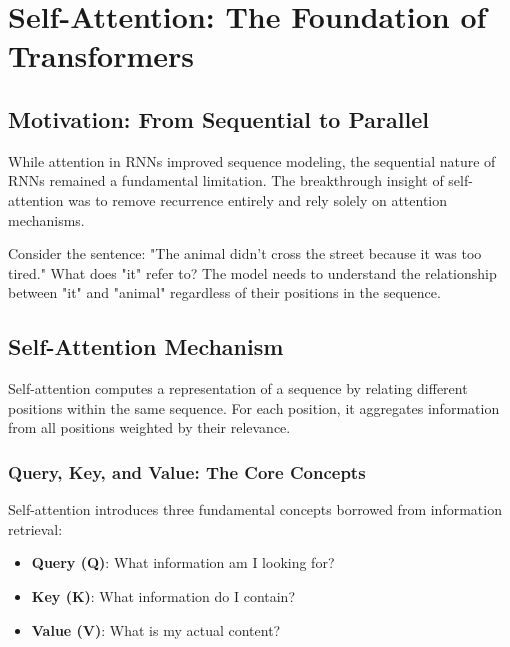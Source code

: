 
\section{Self-Attention: The Foundation of Transformers}

\subsection{Motivation: From Sequential to Parallel}

While attention in RNNs improved sequence modeling, the sequential nature of RNNs remained a fundamental limitation. The breakthrough insight of self-attention was to remove recurrence entirely and rely solely on attention mechanisms.

Consider the sentence: "The animal didn't cross the street because it was too tired."
What does "it" refer to? The model needs to understand the relationship between "it" and "animal" regardless of their positions in the sequence.

\subsection{Self-Attention Mechanism}

Self-attention computes a representation of a sequence by relating different positions within the same sequence. For each position, it aggregates information from all positions weighted by their relevance.

\subsubsection{Query, Key, and Value: The Core Concepts}

Self-attention introduces three fundamental concepts borrowed from information retrieval:

\begin{itemize}
    \item \textbf{Query (Q)}: What information am I looking for?
    \item \textbf{Key (K)}: What information do I contain?
    \item \textbf{Value (V)}: What is my actual content?
\end{itemize}

